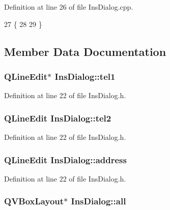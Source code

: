 Definition at line 26 of file Ins\+Dialog.\+cpp.


\begin{DoxyCode}
27 \{
28     
29 \}
\end{DoxyCode}


\subsection{Member Data Documentation}
\hypertarget{class_ins_dialog_a2edd5f0fce0dcc6f12c4f8cd391b5fc0}{
\subsubsection[{tel1}]{\setlength{\rightskip}{0pt plus 5cm}Q\+Line\+Edit$\ast$ Ins\+Dialog\+::tel1\hspace{0.3cm}{\ttfamily [private]}}}\label{class_ins_dialog_a2edd5f0fce0dcc6f12c4f8cd391b5fc0}


Definition at line 22 of file Ins\+Dialog.\+h.

\hypertarget{class_ins_dialog_a80b1bd54ec9e97020280559e6b5532db}{
\subsubsection[{tel2}]{\setlength{\rightskip}{0pt plus 5cm}Q\+Line\+Edit Ins\+Dialog\+::tel2\hspace{0.3cm}{\ttfamily [private]}}}\label{class_ins_dialog_a80b1bd54ec9e97020280559e6b5532db}


Definition at line 22 of file Ins\+Dialog.\+h.

\hypertarget{class_ins_dialog_acd23e80138ee75cc27dd87dff5457ba9}{
\subsubsection[{address}]{\setlength{\rightskip}{0pt plus 5cm}Q\+Line\+Edit Ins\+Dialog\+::address\hspace{0.3cm}{\ttfamily [private]}}}\label{class_ins_dialog_acd23e80138ee75cc27dd87dff5457ba9}


Definition at line 22 of file Ins\+Dialog.\+h.

\hypertarget{class_ins_dialog_ab8de5f3cd72b44a3b3524fc52bac148c}{
\subsubsection[{all}]{\setlength{\rightskip}{0pt plus 5cm}Q\+V\+Box\+Layout$\ast$ Ins\+Dialog\+::all\hspace{0.3cm}{\ttfamily [private]}}}\label{class_ins_dialog_ab8de5f3cd72b44a3b3524fc52bac148c}


